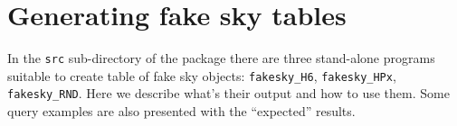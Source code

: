 \documentclass[10pt,titlepage]{article}
\newcommand{\syntax}[1]
{
  \bigskip
  \noindent
  \textbf{Syntax:} \\ 
  \indent \texttt{#1}
}
\newenvironment{parameters}
{
  \medskip
  \noindent
  \textbf{Parameters:}
  \begin{enumerate}
}
{
  \end{enumerate}
}
\newcommand{\param}[2]
{
  \item \textit{#1} \texttt{#2} 
}
\newcommand{\return}[1]
{
  \medskip
  \noindent
  \textbf{Return value} (\texttt{#1}): \\
  \indent
}
\begin{document}
%
%
%
%
%
%
%
%
%


%
\newpage
\section{Generating fake sky tables}
\label{sec:fakesky}
In the \verb|src| sub-directory of the package there are three stand-alone
programs suitable to create table of fake sky
objects: \verb|fakesky_H6|, \verb|fakesky_HPx|, \verb|fakesky_RND|.
Here we describe what's their output and how to use them.
Some query examples are also presented with the ``expected'' results.
\end{document}
